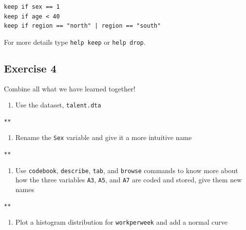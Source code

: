 \documentclass[]{book}
\providecommand{\tightlist}{%
  \setlength{\itemsep}{0pt}\setlength{\parskip}{0pt}}
\begin{document}
\begin{verbatim}
keep if sex == 1
keep if age < 40
keep if region == "north" | region == "south"
\end{verbatim}

For more details type \texttt{help\ keep} or \texttt{help\ drop}.

\hypertarget{exercise-4-2}{%
\subsection{Exercise 4}\label{exercise-4-2}}

Combine all what we have learned together!

\begin{enumerate}
\def\labelenumi{\arabic{enumi}.}
\tightlist
\item
  Use the dataset, \texttt{talent.dta}
\end{enumerate}

\begin{verbatim}
**
\end{verbatim}

\begin{enumerate}
\def\labelenumi{\arabic{enumi}.}
\setcounter{enumi}{1}
\tightlist
\item
  Rename the \texttt{Sex} variable and give it a more intuitive name
\end{enumerate}

\begin{verbatim}
**
\end{verbatim}

\begin{enumerate}
\def\labelenumi{\arabic{enumi}.}
\setcounter{enumi}{2}
\tightlist
\item
  Use \texttt{codebook}, \texttt{describe}, \texttt{tab}, and \texttt{browse} commands to know more about how the three variables \texttt{A3}, \texttt{A5}, and \texttt{A7} are coded and stored, give them new names
\end{enumerate}

\begin{verbatim}
**
\end{verbatim}

\begin{enumerate}
\def\labelenumi{\arabic{enumi}.}
\setcounter{enumi}{3}
\tightlist
\item
  Plot a histogram distribution for \texttt{workperweek} and add a normal curve
\end{enumerate}
\end{document}
